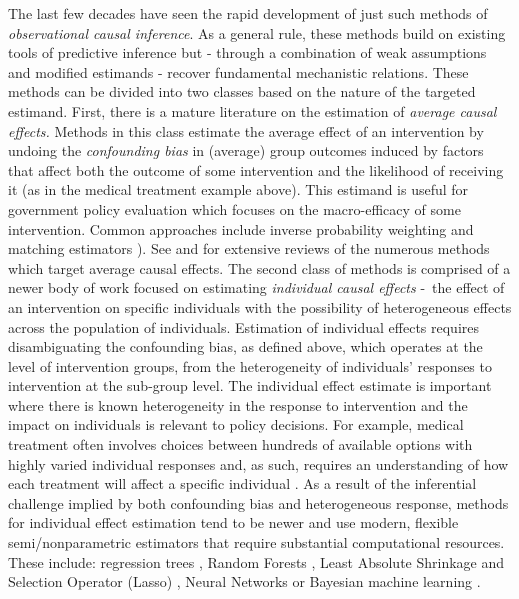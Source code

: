 \documentclass[../main.tex]{subfiles}
\begin{document}
\vspace{\baselineskip}
The last few decades have seen the rapid development of just such methods of \textit{observational causal inference}. As a general rule, these methods build on existing tools of predictive inference but - through a combination of weak assumptions and modified estimands - recover fundamental mechanistic relations. These methods can be divided into two classes based on the nature of the targeted estimand. First, there is a mature literature on the estimation of \textit{average causal effects. }Methods in this class estimate the average effect of an intervention by undoing the \textit{confounding bias} in (average) group outcomes induced by factors that affect both the outcome of some intervention and the likelihood of receiving it (as in the medical treatment example above). This estimand is useful for government policy evaluation which focuses on the macro-efficacy of some intervention. Common approaches include inverse probability weighting \parencite{Horvitz1952AUniverse, Hirano2003EfficientScore} and matching estimators ). See \textcite{Imbens2009RecentEvaluation} and \textcite{Athey2017TheEvaluation} for extensive reviews of the numerous methods which target average causal effects. The second class of methods is comprised of a newer body of work focused on estimating \textit{individual causal effects }-\ the effect of an intervention on specific individuals with the possibility of heterogeneous effects across the population of individuals. Estimation of individual effects requires disambiguating the confounding bias, as defined above, which operates at the level of intervention groups, from the heterogeneity of individuals’ responses to intervention at the sub-group level. The individual effect estimate is important where there is known heterogeneity in the response to intervention and the impact on individuals is relevant to policy decisions. For example, medical treatment often involves choices between hundreds of available options with highly varied individual responses and, as such, requires an understanding of how each treatment will affect a specific individual \parencite{Lu2018EstimatingMethods}. As a result of the inferential challenge implied by both confounding bias and heterogeneous response, methods for individual effect estimation tend to be newer and use modern, flexible semi/nonparametric estimators that require substantial computational resources. These include: regression trees \parencite{Su2009SubgroupTsai, Athey2016RecursiveEffects}, Random Forests \parencite{Wager2018EstimationForests, Athey2019GeneralizedForests}, Least Absolute Shrinkage and Selection Operator (Lasso) \parencite{Qian2011PerformanceRules, Tian2014ACovariates, Chen2017AScoring}, Neural Networks  \parencite{Johansson2016LearningInference, Johansson2018LearningDesigns, Schwab2018PerfectNetworks, Li2017MatchingEstimation, Kunzel2018TransferNetworks} or Bayesian machine learning \parencite{Hill2011BayesianInference, Taddy2016AExperimentation}.
\end{document}
